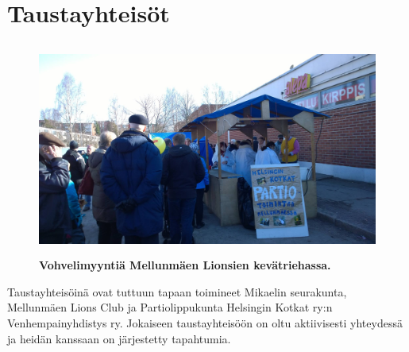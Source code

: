 \documentclass[a4paper, 12pt, finnish]{report} %
\begin{document}
\section{Taustayhteisöt}
\begin{figure}[htb]
	\begin{center}
		\includegraphics[height=7cm]{lettukestit.jpg}
	\end{center}
	\caption*{\textbf{Vohvelimyyntiä Mellunmäen Lionsien kevätriehassa.}}
\end{figure}

Taustayhteisöinä ovat tuttuun tapaan toimineet Mikaelin seurakunta, Mellunmäen Lions Club ja Partiolippukunta Helsingin Kotkat ry:n Venhempainyhdistys ry. Jokaiseen taustayhteisöön on oltu aktiivisesti yhteydessä ja heidän kanssaan on järjestetty tapahtumia.
\end{document}
